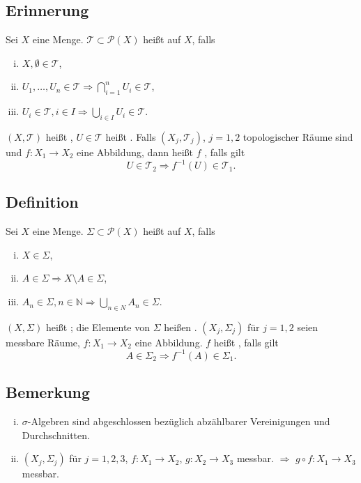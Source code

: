 \subsection[Erinnerung: Topologien, Stetigkeit in topologischen Räumen]{Erinnerung} %
\label{sub:91}
Sei $X$ eine Menge. $\mathcal{T} \subset \mathcal{P}(X)$ heißt  auf $X$, falls 
\begin{enumerate}[(i)]
	\item $X, \emptyset \in \mathcal{T} $,
	\item $U_1, \ldots , U_n \in \mathcal{T} \Longrightarrow  \bigcap_{i=1}^n U_i \in \mathcal{T} $,
	\item $U_i \in \mathcal{T}, i \in I \Longrightarrow \bigcup_{i \in I} U_i \in \mathcal{T} $.
\end{enumerate} 
$(X,\mathcal{T})$ heißt , $U \in \mathcal{T} $ heißt . Falls $(X_j, \mathcal{T}_j)$, $j=1,2$ topologischer Räume sind und
$f : X_1 \to X_2$ eine Abbildung, dann heißt $f$ , falls gilt
\[
	U \in \mathcal{T}_2 \Longrightarrow  f ^{-1} (U) \in \mathcal{T}_1.
\] 

\subsection[Definition: $\sigma$-Algebra, messbarer Raum]{Definition} %
\label{sub:92}
Sei $X$ eine Menge. $\Sigma  \subset \mathcal{P}(X)$ heißt  auf $X$, falls 
\begin{enumerate}[(i)]
	\item $X \in \Sigma$,
	\item $A \in \Sigma \Rightarrow X \setminus A \in \Sigma$,
	\item $A_n \in \Sigma, n \in \mathds{N} \Rightarrow \bigcup_{n \in N} A_n \in \Sigma$.
\end{enumerate}
$(X, \Sigma)$ heißt ; die Elemente von $\Sigma$ heißen .  $(X_j, \Sigma_j)$ für $ j=1,2$ seien messbare Räume,
$f : X_1 \to X_2$ eine Abbildung. $f$ heißt , falls gilt
\[
	A \in \Sigma_2 \Longrightarrow f ^{-1}(A) \in \Sigma_1.
\]

\subsection[Bemerkung: Schnitte und Komposition messbaren Abbildungen in $\sigma$-Algebren]{Bemerkung} %
\label{sub:93}
\begin{enumerate}[(i)]
	\item $\sigma$-Algebren sind abgeschlossen bezüglich abzählbarer Vereinigungen und Durchschnitten.
	\item $(X_j, \Sigma_j)$ für $j=1,2,3$, $f : X_1 \to X_2$, $g : X_2 \to X_3$ messbar. $\Rightarrow $ 
	$g \circ f : X_1 \to X_3$ messbar.
\end{enumerate}

